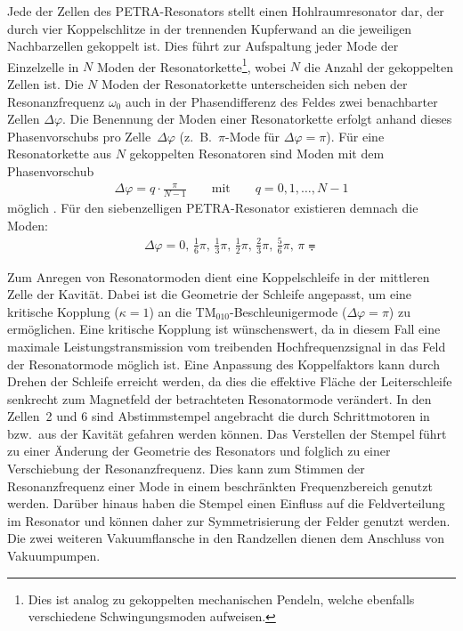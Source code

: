 Jede der Zellen des PETRA-Resonators stellt einen Hohlraumresonator dar, der durch vier Koppelschlitze in der trennenden Kupferwand an die jeweiligen Nachbarzellen gekoppelt ist.
Dies führt zur Aufspaltung jeder Mode der Einzelzelle in $N$ Moden der \glqq Resonatorkette\grqq\footnote{Dies ist analog zu gekoppelten mechanischen Pendeln, welche ebenfalls verschiedene Schwingungsmoden aufweisen.}, wobei $N$ die Anzahl der gekoppelten Zellen ist.
Die $N$ Moden der Resonatorkette unterscheiden sich neben der Resonanzfrequenz $\omega_0$ auch in der Phasendifferenz des Feldes zwei benachbarter Zellen  $\Delta \varphi$.
Die Benennung der Moden einer Resonatorkette erfolgt anhand dieses Phasenvorschubs pro Zelle~$\Delta \varphi$ (z.\ B.\ $\pi$-Mode für $\Delta \varphi = \pi$).
Für eine Resonatorkette aus $N$ gekoppelten Resonatoren sind Moden mit dem Phasenvorschub
\begin{align}
	\Delta \varphi = q \cdot \frac{\pi}{N-1} \qquad \text{mit} \qquad q = 0, 1, \dots, N-1
\end{align}
möglich \cite[S.\ 110]{wangler}.
Für den siebenzelligen PETRA-Resonator existieren demnach die Moden:
\begin{align}
  \Delta \varphi = 0,\, \frac{1}{6} \pi,\, \frac{1}{3} \pi,\, \frac{1}{2} \pi,\, \frac{2}{3} \pi,\, \frac{5}{6} \pi,\, \pi \eqdot
\end{align}

Zum Anregen von Resonatormoden dient eine Koppelschleife \cite{desy_schleife} in der mittleren Zelle der Kavität.
Dabei ist die Geometrie der Schleife angepasst, um eine kritische Kopplung ($\kappa = 1$) an die $\mathrm{TM}_{010}$-Beschleuniger\-mode ($\Delta \varphi = \pi$) zu ermöglichen.
Eine kritische Kopplung ist wünschenswert, da in diesem Fall eine maximale Leistungstransmission vom treibenden Hochfrequenzsignal in das Feld der Resonatormode möglich ist.
Eine Anpassung des Koppelfaktors kann durch Drehen der Schleife erreicht werden, da dies die effektive Fläche der Leiterschleife senkrecht zum Magnetfeld der betrachteten Resonatormode verändert.
In den Zellen~2 und 6 sind Abstimmstempel \cite{desy_stempel} angebracht die durch Schrittmotoren in bzw.\ aus der Kavität gefahren werden können.
Das Verstellen der Stempel führt zu einer Änderung der Geometrie des Resonators und folglich zu einer Verschiebung der Resonanzfrequenz.
Dies kann zum Stimmen der Resonanzfrequenz einer Mode in einem beschränkten Frequenzbereich genutzt werden.
Darüber hinaus haben die Stempel einen Einfluss auf die Feldverteilung im Resonator und können daher zur Symmetrisierung der Felder genutzt werden.
Die zwei weiteren Vakuumflansche in den Randzellen dienen dem Anschluss von Vakuumpumpen.

